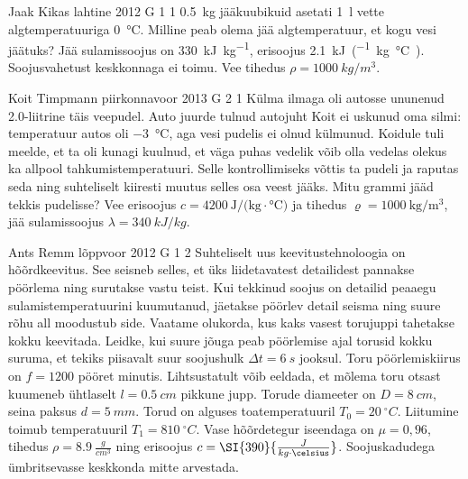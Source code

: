 \documentclass[11pt]{article}
\begin{document}
{%
{Jaak Kikas} %
{lahtine} %
{2012} %
{G 1} %
{1} %
{
\ifStatement
\SI{0,5}{\kilo\gram} jääkuubikuid asetati \SI{1}{l} vette algtemperatuuriga
\SI{0}{\celsius}. Milline peab olema jää algtemperatuur, et kogu vesi jäätuks?
Jää sulamissoojus on \SI{330}{\kilo\joule\per\kilo\gram}, erisoojus
\SI{2,1}{\kilo\joule\per(\kilogram.\celsius)}. Soojusvahetust keskkonnaga ei
toimu.
Vee tihedus $\rho = \SI{1000}{kg/m^3}$.
\fi
}

{Koit Timpmann} %
{piirkonnavoor} %
{2013} %
{G 2} %
{1} %
{
\ifStatement
Külma ilmaga oli autosse ununenud \num{2,0}-liitrine täis veepudel. Auto juurde tulnud
autojuht Koit ei uskunud oma silmi: temperatuur autos oli \SI{-3}{\celsius},
aga vesi pudelis ei olnud külmunud. Koidule tuli meelde, et ta oli kunagi
kuulnud, et väga puhas vedelik võib olla vedelas olekus ka allpool
tahkumistemperatuuri. Selle kontrollimiseks võttis ta pudeli ja raputas seda
ning suhteliselt kiiresti muutus selles osa veest jääks. Mitu grammi jääd tekkis
pudelisse? Vee erisoojus $c = \SI{4200}{\joule\per(\kilogram \cdot \celsius)}$
ja tihedus $\varrho = \SI{1000}{\kilogram\per\meter\cubed}$, jää
sulamissoojus $\lambda = \SI{340}{ kJ/kg}$. 
\fi
}

{Ants Remm} %
{lõppvoor} %
{2012} %
{G 1} %
{2} %
{
\ifStatement
Suhteliselt uus keevitustehnoloogia on hõõrdkeevitus. See seisneb selles, et üks
liidetavatest detailidest pannakse pöörlema ning surutakse vastu teist. Kui
tekkinud soojus on detailid peaaegu sulamistemperatuurini kuumutanud, jäetakse
pöörlev detail seisma ning suure rõhu all moodustub side. Vaatame olukorda, kus
kaks vasest torujuppi tahetakse kokku keevitada. Leidke, kui suure jõuga peab
pöörlemise ajal torusid kokku suruma, et tekiks piisavalt suur soojushulk
$\Delta t = \SI{6}{s}$ jooksul. Toru pöörlemiskiirus on $f = 1200$ pööret
minutis. Lihtsustatult võib eeldada, et mõlema toru otsast kuumeneb ühtlaselt $l
= \SI{0,5}{cm}$ pikkune jupp. Torude diameeter on $D = \SI{8}{cm}$, seina paksus
$d = \SI{5}{mm}$. Torud on alguses toatemperatuuril $T_0 = \SI{20}{^\circ C}$.
Liitumine toimub temperatuuril $T_1 = \SI{810}{^\circ C}$. Vase hõõrdetegur
iseendaga on $\mu = 0,96$, tihedus $\rho = \SI{8,9}{\frac{g}{cm^3}}$ ning
erisoojus $c = \SI{390}{\frac{J}{kg \cdot \celsius}}$. Soojuskadudega ümbritsevasse
keskkonda mitte arvestada.
\fi
}

}
\end{document}
